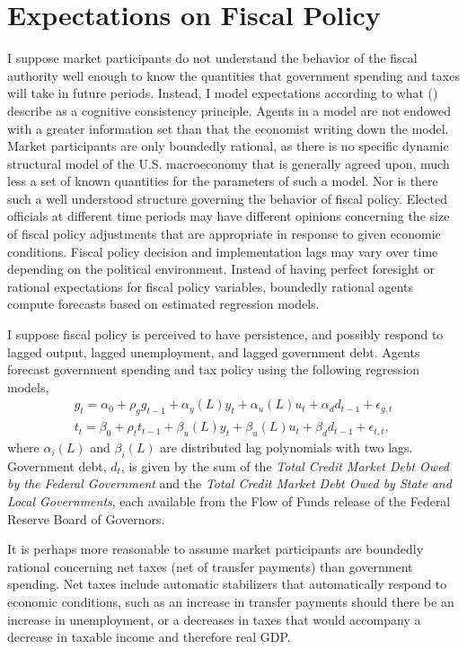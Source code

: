 \documentclass[12pt]{article}
\newcommand{\beq}{\begin{equation}}
\newcommand{\eeq}{\end{equation}}
\newcommand{\citee}[1]{\citename{#1} (\citeyear{#1})}
\begin{document}
\section{Expectations on Fiscal Policy}

I suppose market participants do not understand the behavior of the fiscal authority well enough to know the quantities that government spending and taxes will take in future periods.  Instead, I model expectations according to what \citee{eh2011} describe as a cognitive consistency principle.  Agents in a model are not endowed with a greater information set than that the economist writing down the model.  Market participants are only boundedly rational, as there is no specific dynamic structural model of the U.S. macroeconomy that is generally agreed upon, much less a set of known quantities for the parameters of such a model.  Nor is there such a well understood structure governing the behavior of fiscal policy.  Elected officials at different time periods may have different opinions concerning the size of fiscal policy adjustments that are appropriate in response to given economic conditions.  Fiscal policy decision and implementation lags may vary over time depending on the political environment.  Instead of having perfect foresight or rational expectations for fiscal policy variables, boundedly rational agents compute forecasts based on estimated regression models.

I suppose fiscal policy is perceived to have persistence, and possibly respond to lagged output, lagged unemployment, and lagged government debt.  Agents forecast government spending and tax policy using the following regression models,
\beq \begin{array}{c} \label{eq:fiscalrule}
  g_t = \alpha_0 + \rho_g g_{t-1} + \alpha_y(L) y_t + \alpha_u(L) u_t + \alpha_d d_{t-1} + \epsilon_{g,t} \\ [0.5pc] 
  t_t = \beta_0 + \rho_t t_{t-1} + \beta_u(L) y_t + \beta_u(L) u_t + \beta_d d_{t-1} + \epsilon_{t,t},
\end{array} \eeq
where $\alpha_i(L)$ and $\beta_i(L)$ are distributed lag polynomials with two lags.  Government debt, $d_t$, is given by the sum of the \textit{Total Credit Market Debt Owed by the Federal Government} and the \textit{Total Credit Market Debt Owed by State and Local Governments}, each available from the Flow of Funds release of the Federal Reserve Board of Governors.

It is perhaps more reasonable to assume market participants are boundedly rational concerning net taxes (net of transfer payments) than government spending.  Net taxes include automatic stabilizers that automatically respond to economic conditions, such as an increase in transfer payments should there be an increase in unemployment, or a decreases in taxes that would accompany a decrease in taxable income and therefore real GDP.  
\end{document}
